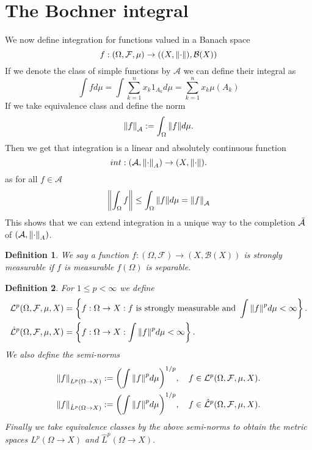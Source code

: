 \documentclass[12pt]{article}
\newtheorem{definition}{Definition}
\begin{document}
\section{The Bochner integral}
We now define integration for functions valued in a Banach space \begin{equation*}
	f:(\Omega,\mathcal{F},\mu)\to ((X,\norm{\cdot}),\mathcal{B}(X))
\end{equation*}
If we denote the class of simple functions by $\mathcal{A}$ we can define their integral as
\begin{equation*}
	\int f d\mu=\int \sum_{k=1}^n x_k 1_{A_k} d\mu=\sum_{k=1}^n x_k\mu({A_k})
\end{equation*}
If we take equivalence class and define the norm
\begin{equation*}
	\norm{f}_\mathcal{A}:=\int_\Omega \norm{f} d\mu.
\end{equation*}
Then we get that integration is a linear and absolutely continuous function
\begin{equation*}
	int: \qty(\mathcal{A},\norm{\cdot}_A)\to (X,\norm{\cdot}).
\end{equation*}
as for all $f\in\mathcal{A}$
\begin{equation*}
	\norm{\int_\Omega f}\leq\int_\Omega \norm{f} d\mu=\norm{f}_\mathcal{A}
\end{equation*}
This shows that we can extend integration in a unique way to the completion $\Bar{\mathcal{A}}$ of $\qty(\mathcal{A},\norm{\cdot}_A)$.
\begin{definition}
	We say a function $f:(\Omega,\mathcal{F})\to (X,\mathcal{B}(X))$ is strongly measurable if $f$ is measurable $f(\Omega)$ is separable.
\end{definition}
\begin{definition}
	For $1\leq p<\infty$ we define
	\begin{align*}
		\mathcal{L}^p(\Omega,\mathcal{F},\mu,X)       & =\left\{f:\Omega\to X: f \text{ is strongly measurable and } \int \norm{f}^p d\mu<\infty\right\}. \\
		\hat{\mathcal{L}}^p(\Omega,\mathcal{F},\mu,X) & =\left\{f:\Omega\to X: \int \norm{f}^p d\mu<\infty\right\}.
	\end{align*}
	We also define the semi-norms
	\begin{align*}
		\norm{f}_{L^p(\Omega\to X)}       & :=\qty(\int \norm{f}^p d\mu)^{1/p},\quad f\in\mathcal{L}^p(\Omega,\mathcal{F},\mu,X).       \\
		\norm{f}_{\hat{L}^p(\Omega\to X)} & :=\qty(\int \norm{f}^p d\mu)^{1/p},\quad f\in\hat{\mathcal{L}}^p(\Omega,\mathcal{F},\mu,X).
	\end{align*}
	Finally we take equivalence classes by the above semi-norms to obtain the metric spaces $L^p(\Omega\to X)$ and $\hat{L}^p(\Omega\to X).$
\end{definition}
\end{document}
